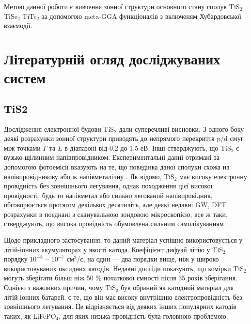 Метою данної роботи є вивчення зонної структури основного стану сполук TiS$_2$ TiSe$_2$ TiTe$_2$ за допомогою meta-GGA функціоналів з включеням Хубардовської взаємодії. 

\section{Літературній огляд досліджуваних систем}
\subsection{TiS2}
Дослідження електронної будови TiS$_{2}$ дали суперечливі висновки. З одного боку деякі розрахунки зонної структури приводять до непрямого перекриття p/d смуг між точками $\Gamma$ та $L$ в діапазоні від 0.2 до 1,5 еВ. Інші стверджують, що TiS$_{2}$ є вузько-щілинним напівпровідником. Експериментальні данні отримані за допомогою фотоемісії вказують на те, що поведінка даної сполуки схожа на напівпровідникову \cite{semiconducter} або ж напівметалічну \cite{semimetal}. Як відомо, TiS$_{2}$ має високу електронну провідність без зовнішнього легування, однак походження цієї високої провідності, будь то напівметал або сильно легований напівпровідник, обговорюється протягом декількох десятиліть, але деякі недавні GW, DFT розрахунки в поєднані з сканувальною зондовою мікроскопією, все ж таки, стверджують, що висока провідність обумовлена сильним самолікуванням \cite{semimetal_or_semiconducter}. 

Щодо прикладного застосування, то даний матеріал успішно використовується у літій-іонних акумуляторах у якості катода. Коефіцієнт дифузії літію у TiS$_2$ порядку $10^{-8}-10^{-7}$ см$^2$/с, на один --- два порядки вище, ніж у широко використовуваних оксидних катодів. Недавні досліди показують, що комірки TiS$_2$ могуть зберігати більш ніж 50 \% початкової ємності після 35 років зберігання. Однією з важливих причин, чому TiS$_2$ був обраний як катодний матеріал для літій-іонних батарей, є те, що він має високу внутрішню електропровідність без зовнішнього легування. Це відрізняється від деяких інших популярних катодів таких, як LiFePO$_4$, для яких низька провідність була головною проблемою.

